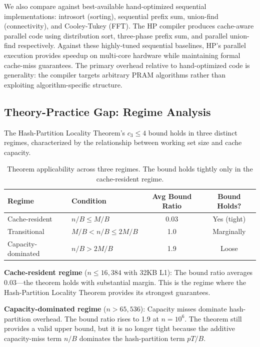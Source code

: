 \documentclass[11pt]{article}
\begin{document}
We also compare against best-available hand-optimized sequential
implementations: introsort (sorting), sequential prefix sum,
union-find (connectivity), and Cooley-Tukey (FFT).  The HP compiler
produces cache-aware parallel code using distribution sort, three-phase
prefix sum, and parallel union-find respectively.  Against these
highly-tuned sequential baselines, HP's parallel execution provides
speedup on multi-core hardware while maintaining formal cache-miss
guarantees.  The primary overhead relative to hand-optimized code is
generality: the compiler targets arbitrary PRAM algorithms rather than
exploiting algorithm-specific structure.

\subsection{Theory-Practice Gap: Regime Analysis}
\label{sec:eval-gap}

The Hash-Partition Locality Theorem's $c_3 \le 4$ bound holds in three
distinct regimes, characterized by the relationship between working set
size and cache capacity.

\begin{table}[t]
\centering
\caption{Theorem applicability across three regimes.  The bound holds
  tightly only in the cache-resident regime.}
\label{tab:regimes}
\begin{tabular}{@{}llcc@{}}
\toprule
\textbf{Regime} & \textbf{Condition} & \textbf{Avg Bound Ratio} & \textbf{Bound Holds?} \\
\midrule
Cache-resident & $n/B \le M/B$ & 0.03 & Yes (tight) \\
Transitional & $M/B < n/B \le 2M/B$ & 1.0 & Marginally \\
Capacity-dominated & $n/B > 2M/B$ & 1.9 & Loose \\
\bottomrule
\end{tabular}
\end{table}

\textbf{Cache-resident regime} ($n \le 16{,}384$ with 32KB L1):
The bound ratio averages 0.03---the theorem holds with substantial
margin.  This is the regime where the Hash-Partition Locality Theorem
provides its strongest guarantees.

\textbf{Capacity-dominated regime} ($n > 65{,}536$):
Capacity misses dominate hash-partition overhead.  The bound ratio
rises to 1.9 at $n = 10^6$.  The theorem still provides a valid upper
bound, but it is no longer tight because the additive capacity-miss
term $n/B$ dominates the hash-partition term $pT/B$.
\end{document}
